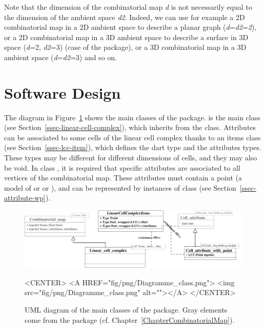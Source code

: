 Note that the dimension of the combinatorial map \emph{d} is not
necessarily equal to the dimension of the ambient space
\emph{d2}. Indeed, we can use for example a 2D combinatorial map in a
2D ambient space to describe a planar graph
(\emph{d}=\emph{d2}=\emph{2}), or a 2D combinatorial map in a 3D
ambient space to describe a surface in 3D space (\emph{d}=2,
\emph{d2}=3) (case of the  package), or a 3D
combinatorial map in a 3D ambient space (\emph{d}=\emph{d2}=3) and so
on.

\section{Software Design}

The diagram in Figure~\ref{fig-diagram_class_lcc} shows the main
classes of the package.   is the main
class (see Section~\ref{ssec-linear-cell-complex}), which inherits from
the  class.  Attributes can be associated
to some cells of the linear cell complex thanks to an items class (see
Section~\ref{ssec-lcc-item}), which defines the dart type and the
attributes types. These types may be different for different
dimensions of cells, and they may also be void.  In class
, it is required that
specific attributes are associated to all vertices of the
combinatorial map. These attributes must contain a point (a model of
 or  or ),
and can be represented by instances of class
 (see
Section~\ref{ssec-attribute-wp}).
%
\begin{figure}
  \begin{ccTexOnly}
    \begin{center}
      \includegraphics[width=.95\textwidth]
      {Linear_cell_complex/fig/pdf/Diagramme_class}
    \end{center}
  \end{ccTexOnly}
  \begin{ccHtmlOnly}
    <CENTER>
    <A HREF="fig/png/Diagramme_class.png">
        <img src="fig/png/Diagramme_class.png" alt=""></A>
    </CENTER>
    \end{ccHtmlOnly}
    \caption{UML diagram of the main classes of the package. Gray
      elements come from the  package 
      (cf. Chapter~\ref{ChapterCombinatorialMap}).}
    \label{fig-diagram_class_lcc}
\end{figure}

